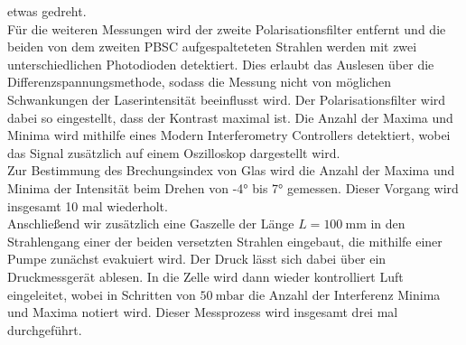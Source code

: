 etwas gedreht. \\
Für die weiteren Messungen wird der zweite Polarisationsfilter entfernt und die beiden von
dem zweiten PBSC aufgespalteteten Strahlen werden mit zwei unterschiedlichen
Photodioden detektiert. Dies erlaubt das Auslesen über die Differenzspannungsmethode,
sodass die Messung nicht von möglichen Schwankungen der Laserintensität beeinflusst wird.
Der Polarisationsfilter wird dabei so eingestellt,
dass der Kontrast maximal ist. Die Anzahl der Maxima und Minima wird mithilfe eines
Modern Interferometry Controllers detektiert, wobei das Signal zusätzlich auf einem
Oszilloskop dargestellt wird. \\
Zur Bestimmung des Brechungsindex von Glas wird die Anzahl der Maxima und Minima
der Intensität beim Drehen von -4° bis 7° gemessen. Dieser Vorgang wird insgesamt 10 mal wiederholt.
\\
Anschließend wir zusätzlich eine Gaszelle der Länge $L=\SI{100}{\milli\metre}$
in den Strahlengang einer der beiden versetzten Strahlen
eingebaut, die mithilfe einer Pumpe zunächst evakuiert wird. Der Druck lässt sich dabei
über ein Druckmessgerät ablesen.
In die Zelle wird dann wieder kontrolliert Luft eingeleitet, wobei in Schritten
von $\SI{50}{\milli\bar}$ die Anzahl der Interferenz Minima und Maxima notiert wird. Dieser
Messprozess wird insgesamt drei mal durchgeführt.
